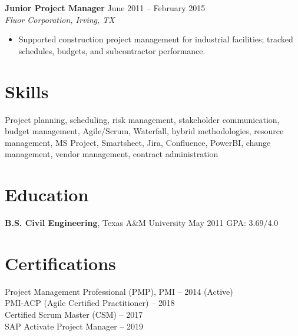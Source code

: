 \documentclass[11pt,letterpaper]{article}
\begin{document}
\vspace{4pt}
\noindent\textbf{Junior Project Manager} \hfill June 2011 -- February 2015\\
\textit{Fluor Corporation, Irving, TX}
\begin{itemize}
  \item Supported construction project management for industrial facilities; tracked schedules, budgets, and subcontractor performance.
\end{itemize}

\section{Skills}

Project planning, scheduling, risk management, stakeholder communication, budget management, Agile/Scrum, Waterfall, hybrid methodologies, resource management, MS Project, Smartsheet, Jira, Confluence, PowerBI, change management, vendor management, contract administration

\section{Education}

\textbf{B.S. Civil Engineering}, Texas A\&M University \hfill May 2011 \quad GPA: 3.69/4.0

\section{Certifications}

Project Management Professional (PMP), PMI -- 2014 (Active)\\
PMI-ACP (Agile Certified Practitioner) -- 2018\\
Certified Scrum Master (CSM) -- 2017\\
SAP Activate Project Manager -- 2019
\end{document}
